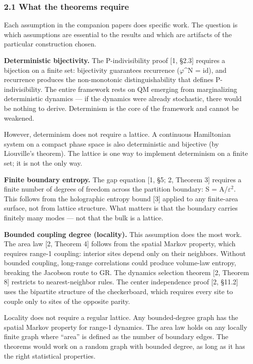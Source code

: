 \documentclass[
  11pt,
]{article}
\begin{document}
\hypertarget{what-the-theorems-require}{%
\subsubsection{2.1 What the theorems
require}\label{what-the-theorems-require}}

Each assumption in the companion papers does specific work. The question
is which assumptions are essential to the results and which are
artifacts of the particular construction chosen.

\textbf{Deterministic bijectivity.} The P-indivisibility proof {[}1,
§2.3{]} requires a bijection on a finite set: bijectivity guarantees
recurrence (\ensuremath{\varphi}\^{}N = id), and recurrence produces the non-monotonic
distinguishability that defines P-indivisibility. The entire framework
rests on QM emerging from marginalizing deterministic dynamics --- if
the dynamics were already stochastic, there would be nothing to derive.
Determinism is the core of the framework and cannot be weakened.

However, determinism does not require a lattice. A continuous
Hamiltonian system on a compact phase space is also deterministic and
bijective (by Liouville's theorem). The lattice is one way to implement
determinism on a finite set; it is not the only way.

\textbf{Finite boundary entropy.} The gap equation {[}1, §5; 2, Theorem
3{]} requires a finite number of degrees of freedom across the partition
boundary: S = A/\ensuremath{\varepsilon}\ensuremath{^2}. This follows from the holographic entropy bound
{[}3{]} applied to any finite-area surface, not from lattice structure.
What matters is that the boundary carries finitely many modes --- not
that the bulk is a lattice.

\textbf{Bounded coupling degree (locality).} This assumption does the
most work. The area law {[}2, Theorem 4{]} follows from the spatial
Markov property, which requires range-1 coupling: interior sites depend
only on their neighbors. Without bounded coupling, long-range
correlations could produce volume-law entropy, breaking the Jacobson
route to GR. The dynamics selection theorem {[}2, Theorem 8{]} restricts
to nearest-neighbor rules. The center independence proof {[}2, §11.2{]}
uses the bipartite structure of the checkerboard, which requires every
site to couple only to sites of the opposite parity.

Locality does not require a regular lattice. Any bounded-degree graph
has the spatial Markov property for range-1 dynamics. The area law holds
on any locally finite graph where ``area'' is defined as the number of
boundary edges. The theorems would work on a random graph with bounded
degree, as long as it has the right statistical properties.
\end{document}
